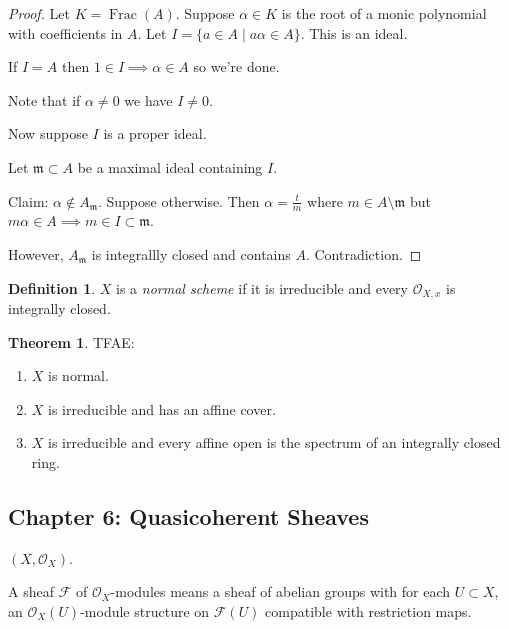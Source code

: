 \documentclass{article}
\theoremstyle{definition}
\newtheorem*{definition}{Definition}
\newtheorem{theorem}{Theorem}
\begin{document}
    \begin{proof}
        Let \(K = \operatorname{Frac} (A)\). Suppose \(\alpha \in K\) is the root of a monic polynomial with coefficients in \(A\). Let \(I = \{ a\in A \mid a \alpha \in A \}\). This is an ideal.

        If \(I = A\) then \(1\in I \implies \alpha \in A\) so we're done.

        Note that if \(\alpha \neq 0\) we have \(I\neq 0\).

        Now suppose \(I\) is a proper ideal.

        Let \(\mathfrak{m} \subset A\) be a maximal ideal containing \(I\).

        Claim: \(\alpha \notin A_{\mathfrak{m}}\). Suppose otherwise. Then \(\alpha = \frac{t}{m}\) where \(m\in A\setminus  \mathfrak{m} \) but \(m \alpha \in A \implies m\in I \subset \mathfrak{m} \).   

        However, \(A_{\mathfrak{m}}\) is integrallly closed and contains \(A\). Contradiction.
    \end{proof}

    \begin{definition}
        \(X\) is a \textit{normal scheme} if it is irreducible and every \(\mathcal{O}_{X,x}\) is integrally closed.
    \end{definition}

    \begin{theorem}
        TFAE:

        \begin{enumerate}[label=\arabic*)]
            \item \(X\) is normal.
            \item \(X\) is irreducible and has an affine cover.
            \item \(X\) is irreducible and every affine open is the spectrum of an integrally closed ring. 
        \end{enumerate} 
    \end{theorem}

    \subsection*{Chapter 6: Quasicoherent Sheaves}

    \((X, \mathcal{O}_X)\).

    A sheaf \(\mathcal{F}\) of \(\mathcal{O}_X\)-modules means a sheaf of abelian groups with for each \(U \subset X\), an \(\mathcal{O}_X(U)\)-module structure on \(\mathcal{F} (U)\) compatible with restriction maps.
    
\end{document}
